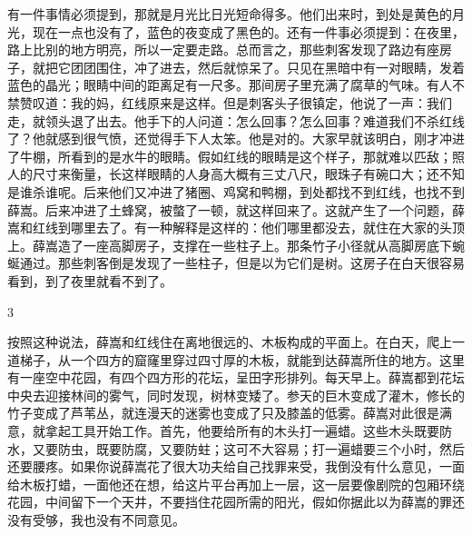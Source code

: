 有一件事情必须提到，那就是月光比日光短命得多。他们出来时，到处是黄色的月光，现在一点也没有了，蓝色的夜变成了黑色的。还有一件事必须提到：在夜里，路上比别的地方明亮，所以一定要走路。总而言之，那些刺客发现了路边有座房子，就把它团团围住，冲了进去，然后就惊呆了。只见在黑暗中有一对眼睛，发着蓝色的晶光；眼睛中间的距离足有一尺多。那间房子里充满了腐草的气味。有人不禁赞叹道：我的妈，红线原来是这样。但是刺客头子很镇定，他说了一声：我们走，就领头退了出去。他手下的人问道：怎么回事？怎么回事？难道我们不杀红线了？他就感到很气愤，还觉得手下人太笨。他是对的。大家早就该明白，刚才冲进了牛棚，所看到的是水牛的眼睛。假如红线的眼睛是这个样子，那就难以匹敌；照人的尺寸来衡量，长这样眼睛的人身高大概有三丈八尺，眼珠子有碗口大；还不知是谁杀谁呢。后来他们又冲进了猪圈、鸡窝和鸭棚，到处都找不到红线，也找不到薛嵩。后来冲进了土蜂窝，被螫了一顿，就这样回来了。这就产生了一个问题，薛嵩和红线到哪里去了。有一种解释是这样的：他们哪里都没去，就住在大家的头顶上。薛嵩造了一座高脚房子，支撑在一些柱子上。那条竹子小径就从高脚房底下蜿蜒通过。那些刺客倒是发现了一些柱子，但是以为它们是树。这房子在白天很容易看到，到了夜里就看不到了。 

3 

按照这种说法，薛嵩和红线住在离地很远的、木板构成的平面上。在白天，爬上一道梯子，从一个四方的窟窿里穿过四寸厚的木板，就能到达薛嵩所住的地方。这里有一座空中花园，有四个四方形的花坛，呈田字形排列。每天早上。薛嵩都到花坛中央去迎接林间的雾气，同时发现，树林变矮了。参天的巨木变成了灌木，修长的竹子变成了芦苇丛，就连漫天的迷雾也变成了只及膝盖的低雾。薛嵩对此很是满意，就拿起工具开始工作。首先，他要给所有的木头打一遍蜡。这些木头既要防水，又要防虫，既要防腐，又要防蛀；这可不大容易；打一遍蜡要三个小时，然后还要腰疼。如果你说薛嵩花了很大功夫给自己找罪来受，我倒没有什么意见，一面给木板打蜡，一面他还在想，给这片平台再加上一层，这一层要像剧院的包厢环绕花园，中间留下一个天井，不要挡住花园所需的阳光，假如你据此以为薛嵩的罪还没有受够，我也没有不同意见。 


